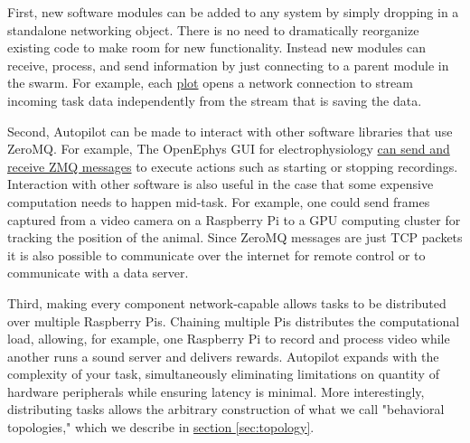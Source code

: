 First, new software modules can be added to any system by simply dropping in a standalone networking object. There is no need to dramatically reorganize existing code to make room for new functionality. Instead new modules can receive, process, and send information by just connecting to a parent module in the swarm. For example, each \hyperref[sec:plotting]{plot} opens a network connection to stream incoming task data independently from the stream that is saving the data.

Second, Autopilot can be made to interact with other software libraries that use ZeroMQ. For example, The OpenEphys GUI for electrophysiology \href{https://open-ephys.atlassian.net/wiki/spaces/OEW/pages/23265310/Network+Events}{can send and receive ZMQ messages} to execute actions such as starting or stopping recordings. Interaction with other software is also useful in the case that some expensive computation needs to happen mid-task. For example, one could send frames captured from a video camera on a Raspberry Pi to a GPU computing cluster for tracking the position of the animal. Since ZeroMQ messages are just TCP packets it is also possible to communicate over the internet for remote control or to communicate with a data server.

Third, making every component network-capable allows tasks to be distributed over multiple Raspberry Pis. Chaining multiple Pis distributes the computational load, allowing, for example, one Raspberry Pi to record and process video while another runs a sound server and delivers rewards. Autopilot expands with the complexity of your task, simultaneously eliminating limitations on quantity of hardware peripherals while ensuring latency is minimal. More interestingly, distributing tasks allows the arbitrary construction of what we call "behavioral topologies," which we describe in \hyperref[sec:topology]{section \ref*{sec:topology}}.
